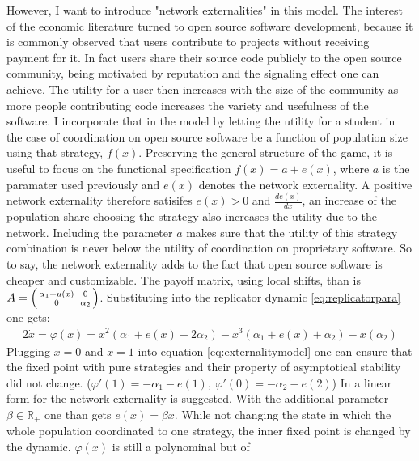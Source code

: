 \documentclass[11pt]{article}
\newcommand{\realnumb}{\mathbb{R}}
\begin{document}
However, I want to introduce "network externalities" in this model. 
The interest of the economic literature turned to open source software 
development, because it is commonly observed that users contribute to 
projects without receiving payment for it.
In fact users share their source code publicly to the open source community,
being motivated by reputation and the signaling effect one can achieve.
The utility for a user then increases with the size of the community as 
more people contributing code increases the variety and usefulness of the 
software. I incorporate that in the model by letting the utility for a student 
in the case of coordination on open source software be a function of 
population size using that strategy, $f(x)$. 
Preserving the general structure of the
game, it is useful to focus on the functional specification 
$f(x) = a + e(x)$, where $a$ is the paramater used previously and $e(x)$ 
denotes the network externality. 
A positive network externality therefore satisifes $e(x)>0$ and 
$\frac{de(x)}{dx}$, an increase of the population share choosing the strategy
also increases the utility due to the network. Including the
parameter $a$ makes sure that the utility of this strategy combination is 
never below the utility of coordination on proprietary software. So to say,
the network externality adds to the fact that open source software is cheaper 
and customizable. The payoff matrix, using local shifts, than is 
$A=\begin{psmallmatrix}\alpha_1+u(x) && 0 \\ 0&& \alpha_2\end{psmallmatrix}$. 
Substituting into the replicator dynamic  \ref{eq:replicatorpara} one gets:
\begin{alignat}{2}
        \dot{x} = \varphi(x) = x^2(\alpha_1+e(x) +2\alpha_2 ) 
        - x^3(\alpha_1+e(x)+\alpha_2) - x(\alpha_2)
        \label{eq:externalitymodel}
\end{alignat}
Plugging $x=0$ and $x=1$ into equation \eqref{eq:externalitymodel} one can 
ensure that the fixed point with pure strategies and their
property of asymptotical stability did not change.
($\varphi'(1) = -\alpha_1 -e(1),\ \varphi'(0) = -\alpha_2 -e(2)$)
In \cite{paperaboutnetworkexternality} a linear form for the network
externality is suggested. With the additional parameter $\beta \in \realnumb_+$
one than gets $e(x) = \beta x$. While not changing the state in which
the whole population coordinated to one strategy, the inner fixed point
is changed by the dynamic. $\varphi(x)$ is still a polynominal but of 
\end{document}
